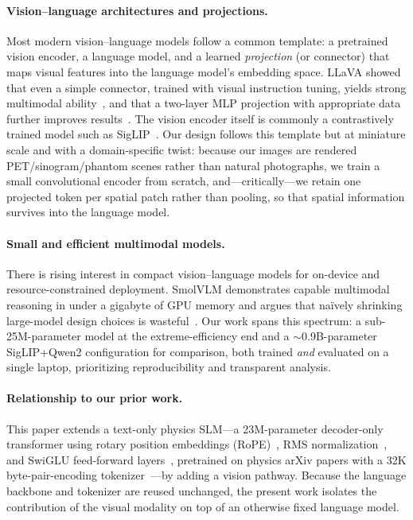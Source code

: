\documentclass[11pt]{article}
\begin{document}
\paragraph{Vision--language architectures and projections.}
Most modern vision--language models follow a common template: a pretrained vision
encoder, a language model, and a learned \emph{projection} (or connector) that
maps visual features into the language model's embedding space. LLaVA showed that
even a simple connector, trained with visual instruction tuning, yields strong
multimodal ability~\cite{liu2023llava}, and that a two-layer MLP projection with
appropriate data further improves results~\cite{liu2024improved}. The vision
encoder itself is commonly a contrastively trained model such as
SigLIP~\cite{zhai2023siglip,tschannen2025siglip2}. Our design follows this
template but at miniature scale and with a domain-specific twist: because our
images are rendered PET/sinogram/phantom scenes rather than natural photographs,
we train a small convolutional encoder from scratch, and---critically---we retain
one projected token per spatial patch rather than pooling, so that spatial
information survives into the language model.

\paragraph{Small and efficient multimodal models.}
There is rising interest in compact vision--language models for on-device and
resource-constrained deployment. SmolVLM demonstrates capable multimodal
reasoning in under a gigabyte of GPU memory and argues that na\"ively shrinking
large-model design choices is wasteful~\cite{marafioti2025smolvlm}. Our work
spans this spectrum: a sub-25M-parameter model at the extreme-efficiency end and a
$\sim$0.9B-parameter SigLIP+Qwen2 configuration for comparison, both trained
\emph{and} evaluated on a single laptop, prioritizing reproducibility and
transparent analysis.

\paragraph{Relationship to our prior work.}
This paper extends a text-only physics SLM---a 23M-parameter decoder-only
transformer using rotary position embeddings (RoPE)~\cite{su2021rope}, RMS
normalization~\cite{zhang2019rmsnorm}, and SwiGLU feed-forward
layers~\cite{shazeer2020glu}, pretrained on physics arXiv papers with a 32K
byte-pair-encoding tokenizer~\cite{sennrich2016bpe}---by adding a vision pathway.
Because the language backbone and tokenizer are reused unchanged, the present work
isolates the contribution of the visual modality on top of an otherwise fixed
language model.
\end{document}
